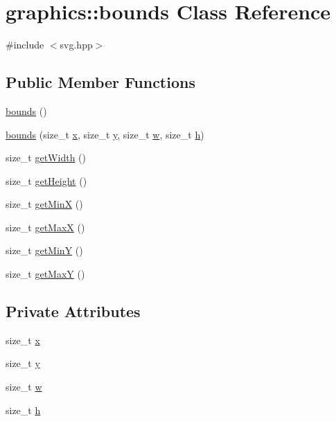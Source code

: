 \hypertarget{classgraphics_1_1bounds}{}\section{graphics\+:\+:bounds Class Reference}
\label{classgraphics_1_1bounds}


{\ttfamily \#include $<$svg.\+hpp$>$}

\subsection*{Public Member Functions}
\begin{DoxyCompactItemize}
\item 
\hyperlink{classgraphics_1_1bounds_a59f667680478d7e2d8403c4afabc6674}{bounds} ()
\item 
\hyperlink{classgraphics_1_1bounds_a2a1529593a8ad03df80df0381e33fb1c}{bounds} (size\+\_\+t \hyperlink{classgraphics_1_1bounds_a6a60b1c6b290e61f5890ea90f78a466c}{x}, size\+\_\+t \hyperlink{classgraphics_1_1bounds_a30a3dfde365caa6aa1d930b07fa3062c}{y}, size\+\_\+t \hyperlink{classgraphics_1_1bounds_a7e1b802df69e5bbcd66e842f4719bd1e}{w}, size\+\_\+t \hyperlink{classgraphics_1_1bounds_a53be9687348393750637ec378c9dd594}{h})
\item 
size\+\_\+t \hyperlink{classgraphics_1_1bounds_a89f6d09f09a7b2b5d995cb64ac305b57}{get\+Width} ()
\item 
size\+\_\+t \hyperlink{classgraphics_1_1bounds_a2c21517e12d0773cd1508de5e7bb8be7}{get\+Height} ()
\item 
size\+\_\+t \hyperlink{classgraphics_1_1bounds_a3cac943aa56e8509f24ab9eac1b7c744}{get\+MinX} ()
\item 
size\+\_\+t \hyperlink{classgraphics_1_1bounds_af159b7dd1e1dbec98a8202744b13e4c4}{get\+MaxX} ()
\item 
size\+\_\+t \hyperlink{classgraphics_1_1bounds_a948e28bed8b061726dd6b0d02d44c527}{get\+MinY} ()
\item 
size\+\_\+t \hyperlink{classgraphics_1_1bounds_a5ba618b1e138eaabdf33b513c5696529}{get\+MaxY} ()
\end{DoxyCompactItemize}
\subsection*{Private Attributes}
\begin{DoxyCompactItemize}
\item 
size\+\_\+t \hyperlink{classgraphics_1_1bounds_a6a60b1c6b290e61f5890ea90f78a466c}{x}
\item 
size\+\_\+t \hyperlink{classgraphics_1_1bounds_a30a3dfde365caa6aa1d930b07fa3062c}{y}
\item 
size\+\_\+t \hyperlink{classgraphics_1_1bounds_a7e1b802df69e5bbcd66e842f4719bd1e}{w}
\item 
size\+\_\+t \hyperlink{classgraphics_1_1bounds_a53be9687348393750637ec378c9dd594}{h}
\end{DoxyCompactItemize}


